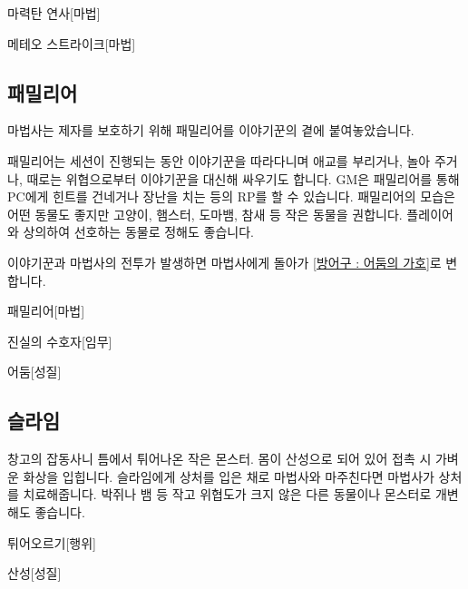 \documentclass{report}
\begin{document}
		\begin{spoiler}{마력탄 연사}{[마법]}
		\end{spoiler}
		
		\begin{spoiler}{메테오 스트라이크}{[마법]}
		\end{spoiler}
	
	\pagebreak 
	\subsection*{패밀리어}
		마법사는 제자를 보호하기 위해 패밀리어를 이야기꾼의 곁에 붙여놓았습니다.
		
		패밀리어는 세션이 진행되는 동안 이야기꾼을 따라다니며 애교를 부리거나, 놀아 주거나, 때로는 위협으로부터 이야기꾼을 대신해 싸우기도 합니다. GM은 패밀리어를 통해 PC에게 힌트를 건네거나 장난을 치는 등의 RP를 할 수 있습니다. 패밀리어의 모습은 어떤 동물도 좋지만 고양이, 햄스터, 도마뱀, 참새 등 작은 동물을 권합니다. 플레이어와 상의하여 선호하는 동물로 정해도 좋습니다.
		
		이야기꾼과 마법사의 전투가 발생하면 마법사에게 돌아가 \hyperlink{npc-wizard:armor}{[방어구 : 어둠의 가호]}로 변합니다.
		
		\begin{spoiler}{패밀리어}{[마법]}
		\end{spoiler}
		
		\begin{spoiler}{진실의 수호자}{[임무]}
		\end{spoiler}
		
		\begin{spoiler}{어둠}{[성질]}
		\end{spoiler}
	
	\pagebreak 
	\subsection*{슬라임}
		창고의 잡동사니 틈에서 튀어나온 작은 몬스터. 몸이 산성으로 되어 있어 접촉 시 가벼운 화상을 입힙니다. 슬라임에게 상처를 입은 채로 마법사와 마주친다면 마법사가 상처를 치료해줍니다. 박쥐나 뱀 등 작고 위협도가 크지 않은 다른 동물이나 몬스터로 개변해도 좋습니다.
		
		\begin{spoiler}{튀어오르기}{[행위]}
		\end{spoiler}
		
		\begin{spoiler}{산성}{[성질]}
		\end{spoiler}
	
\end{document}
